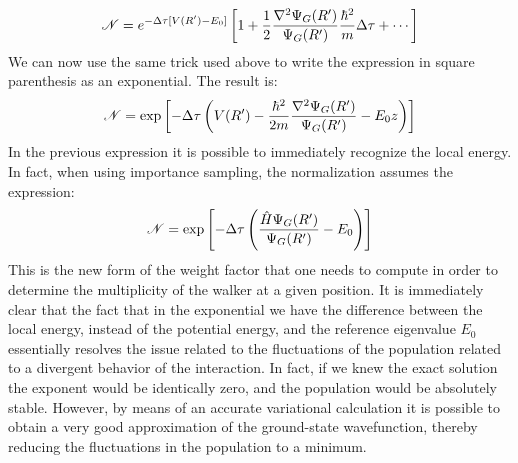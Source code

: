 \begin{equation}
{\cal N}=e^{-\Delta\tau[V(R')-E_0]}\left[1+\frac{1}{2}\frac{\nabla^2\Psi_G(R')}{\Psi_G(R')}\frac{\hbar^2}{m}\Delta\tau+\cdots\right]
\end{equation}
We can now use the same trick used above to write the expression in square parenthesis as an exponential. The result is:
\begin{equation}
{\cal N}= \exp\left[-\Delta\tau\left(V(R')-\frac{\hbar^2}{2m}\frac{\nabla^2\Psi_G(R')}{\Psi_G(R')}-E_0z\right)\right]
\end{equation}
In the previous expression it is possible to immediately recognize the local energy. In fact, when using importance sampling, the normalization assumes the expression:
\begin{equation}
{\cal N}= \exp\left[-\Delta\tau\left(\frac{\hat{H}\Psi_G(R')}{\Psi_G(R')}-E_0\right)\right]
\end{equation}
This is the new form of the weight factor that one needs to compute in order to determine the multiplicity of the walker at a given position. It is immediately clear that the fact that in the exponential we have the difference between the local energy, instead of the potential energy, and the reference eigenvalue $E_0$ essentially resolves the issue related to the fluctuations of the population related to a divergent behavior of the interaction. In fact, if we knew the exact solution the exponent would be identically zero, and the population would be absolutely stable. However, by means of an accurate variational calculation it is possible to obtain a very good approximation of the ground-state wavefunction, thereby reducing the fluctuations in the population to a minimum. 

